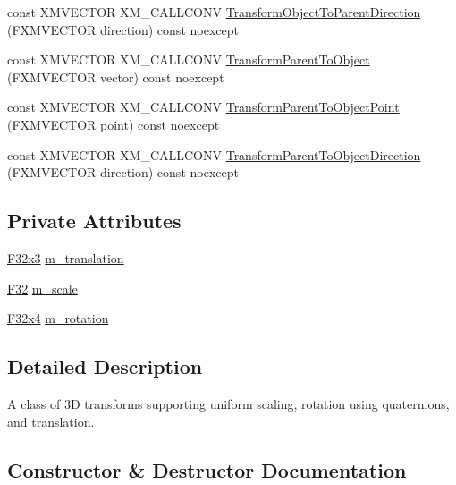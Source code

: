 \begin{DoxyCompactItemize}
\item 
const X\+M\+V\+E\+C\+T\+OR X\+M\+\_\+\+C\+A\+L\+L\+C\+O\+NV \mbox{\hyperlink{classmage_1_1_s1_q_t_transform3_d_a117a81d968b84880c2945445bb8dd111}{Transform\+Object\+To\+Parent\+Direction}} (F\+X\+M\+V\+E\+C\+T\+OR direction) const noexcept
\item 
const X\+M\+V\+E\+C\+T\+OR X\+M\+\_\+\+C\+A\+L\+L\+C\+O\+NV \mbox{\hyperlink{classmage_1_1_s1_q_t_transform3_d_a53b1794449267e88858e6c955212a855}{Transform\+Parent\+To\+Object}} (F\+X\+M\+V\+E\+C\+T\+OR vector) const noexcept
\item 
const X\+M\+V\+E\+C\+T\+OR X\+M\+\_\+\+C\+A\+L\+L\+C\+O\+NV \mbox{\hyperlink{classmage_1_1_s1_q_t_transform3_d_a3219ed3a7f86669081239d26d677b668}{Transform\+Parent\+To\+Object\+Point}} (F\+X\+M\+V\+E\+C\+T\+OR point) const noexcept
\item 
const X\+M\+V\+E\+C\+T\+OR X\+M\+\_\+\+C\+A\+L\+L\+C\+O\+NV \mbox{\hyperlink{classmage_1_1_s1_q_t_transform3_d_ab3acc5abd348f393ba2363e1b912baf5}{Transform\+Parent\+To\+Object\+Direction}} (F\+X\+M\+V\+E\+C\+T\+OR direction) const noexcept
\end{DoxyCompactItemize}
\subsection*{Private Attributes}
\begin{DoxyCompactItemize}
\item 
\mbox{\hyperlink{namespacemage_a1e3c7a882af461f161caa1cbddaf1fa2}{F32x3}} \mbox{\hyperlink{classmage_1_1_s1_q_t_transform3_d_ac5a9eb3e71ae8911143c431e672eb094}{m\+\_\+translation}}
\item 
\mbox{\hyperlink{namespacemage_aa97e833b45f06d60a0a9c4fc22ae02c0}{F32}} \mbox{\hyperlink{classmage_1_1_s1_q_t_transform3_d_ae1e71daf3e9c4b860d33735f8613a0e6}{m\+\_\+scale}}
\item 
\mbox{\hyperlink{namespacemage_a851648f37dfb126a2d2f973e102861ad}{F32x4}} \mbox{\hyperlink{classmage_1_1_s1_q_t_transform3_d_af21d33f5abb6454a3eeb91c9503c8f78}{m\+\_\+rotation}}
\end{DoxyCompactItemize}


\subsection{Detailed Description}
A class of 3D transforms supporting uniform scaling, rotation using quaternions, and translation. 

\subsection{Constructor \& Destructor Documentation}
\mbox{\label{classmage_1_1_s1_q_t_transform3_d_ad352fa570668d9daa7e910a0ccd52f92}} 

